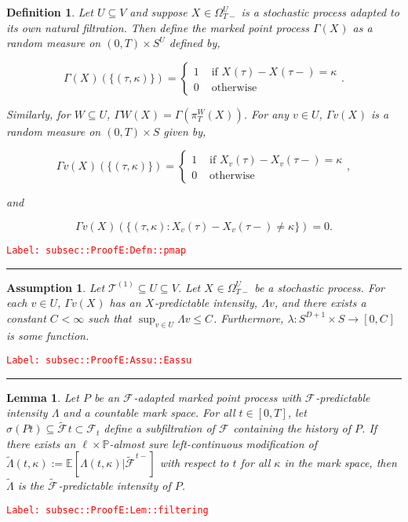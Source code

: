 \documentclass[12pt]{article}
\newcommand{\mb}{\mathbb}
\newcommand{\mc}{\mathcal}
\newcommand{\ra}{\rightarrow}
\newcommand{\te}{\text}
\newcommand{\tr}{\textcolor{red}}
\newcommand{\labe}[1]{\tr{\texttt{Label: #1}}}
\newcommand{\lin}{\rule{\linewidth}{0.4 pt}}
\newcommand{\pr}{\mb{P}}							%
\newcommand{\ex}[1]{\mb{E}\left[#1\right]}			%
\renewcommand{\v}{v}							%
\renewcommand{\U}{U}							%
\newcommand{\UU}{W}								%
\renewcommand{\S}{S}							%
\newcommand{\T}{T}								%
\renewcommand{\t}{t}							%
\newcommand{\sset}{\Omega}						%
\newcommand{\proj}{\pi}							%
\newcommand{\F}{\mc{F}}							%
\newcommand{\X}{X}								%
\newcommand{\carp}[1]{^{#1}}					%
\newcommand{\vsi}[1]{^{#1}}						%
\newcommand{\cind}[1]{_{#1}}					%
\newcommand{\tp}[1]{(#1)}						%
\newcommand{\tip}[1]{#1}						%
\newcommand{\ts}[1]{_{#1}}						%
\newcommand{\const}{C}							%
\newcommand{\degr}{D}							%
\newcommand{\tree}{\mc{T}}						%
\newcommand{\sln}[1]{^{(#1)}}						%
\newcommand{\Sm}{\ell}							%
\newcommand{\alt}[1]{\widetilde{#1}}			%
\newcommand{\indx}[1]{_{#1}}					%
\newcommand{\rt}{\tau}							%
\newcommand{\pmap}{\Gamma}						%
\renewcommand{\mark}{\kappa}					%
\newcommand{\rp}{P}								%
\newcommand{\ratee}{\Lambda}					%
\newcommand{\cratee}{\alt{\Lambda}} 			%
\newtheorem{lem}[thms]{Lemma}
\newtheorem{defn}[thms]{Definition}
\newtheorem{assu}[thms]{Assumption}
\begin{document}
\begin{defn}
Let \(\U\subseteq V\) and suppose \(\X\cind{}\tip{} \in \sset\vsi{\U}\ts{\T-}\) is a stochastic process adapted to its own natural filtration. Then define the marked point process \(\pmap{}(\X\cind{}\tip{})\) as a random measure on \((0,\T) \times \S\carp{\U}\) defined by,

\[\pmap{}(\X\cind{}\tip{})(\{(\rt{},\mark{})\}) = \begin{cases}
1 &\te{ if } \X\cind{}\tp{\rt{}} - \X\cind{}\tp{\rt{}-} = \mark{}\\
0 &\te{ otherwise}
\end{cases}.\]

Similarly, for \(\UU \subseteq \U\), \(\pmap{\UU}(\X\cind{}\tip{}) = \pmap{}\left(\proj\vsi{\UU}\ts{\T}(\X\cind{}\tip{})\right)\). For any \(\v\in \U\), \(\pmap{\v}(\X\cind{}\tip{})\) is a random measure on \((0,\T) \times \S\) given by,

\[\pmap{\v}(\X\cind{}\tip{})(\{(\rt{},\mark{})\}) = \begin{cases}
1 &\te{ if } \X\cind{\v}\tp{\rt{}} - \X\cind{\v}\tp{\rt{}-} = \mark{}\\
0 &\te{ otherwise}
\end{cases},\]

and

\[\pmap{\v}(\X\cind{}\tip{})(\{(\rt{},\mark{}): \X\cind{\v}\tp{\rt{}} - \X\cind{\v}\tp{\rt{}-} \neq \mark{}\}) = 0.\]
\label{subsec::ProofE:Defn::pmap}
\end{defn}
\labe{subsec::ProofE:Defn::pmap}

\lin

\begin{assu}
Let \(\tree\sln{1}\subseteq\U \subseteq V\). Let \(\X\cind{}\tip{}\in \sset\vsi{\U}\ts{\T-}\) be a stochastic process. For each \(\v\in \U\), \(\pmap{\v}(\X\cind{}\tip{})\) has an \(\X\cind{}\tip{}\)-predictable intensity, \(\ratee{\v}\), and there exists a constant \(\const\indx{} < \infty\) such that \(\sup_{\v\in\U} \ratee{\v} \leq \const\indx{}\). Furthermore, \(\lambda: \S\carp{\degr+1}\times \S\ra[0,\const\indx{}]\) is some function.
\label{subsec::ProofE:Assu::Eassu}
\end{assu}
\labe{subsec::ProofE:Assu::Eassu}

\lin

\begin{lem}
Let \(\rp{}\) be an \(\F\vsi{}\ts{}\)-adapted marked point process with \(\F\vsi{}\ts{}\)-predictable intensity \(\ratee{}\) and a countable mark space. For all \(\t \in [0,\T]\), let \(\sigma(\rp{\t}) \subseteq \alt{\F\ts{}}{\t}\subset \F\vsi{}\ts{\t}\) define a subfiltration of \(\F\vsi{}\ts{}\) containing the history of \(\rp{}\). If there exists an \(\Sm\times \pr\)-almost sure left-continuous modification of \(\cratee{}{}(\t,\mark{}) := \ex{\ratee{}(\t,\mark{})|\alt{\F\vsi{}\ts{}}^{\t-}}\) with respect to \(\t\) for all \(\mark{}\) in the mark space, then \(\cratee{}{}\) is the \(\alt{\F\vsi{}\ts{}}\)-predictable intensity of \(\rp{}\).
\label{subsec::ProofE:Lem::filtering}
\end{lem}
\labe{subsec::ProofE:Lem::filtering}
\end{document}
